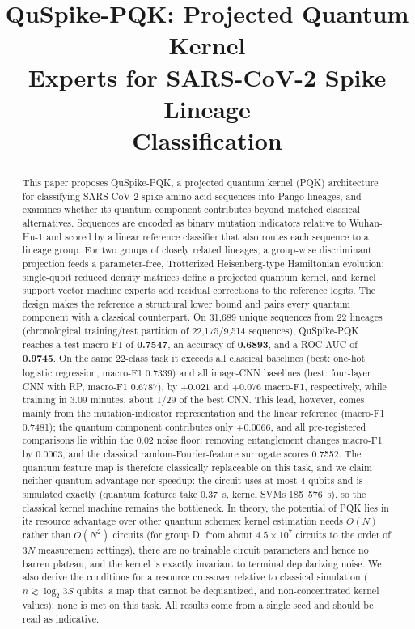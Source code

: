 \documentclass[conference]{IEEEtran}
\begin{document}
\raggedbottom

\title{QuSpike-PQK: Projected Quantum Kernel\\
Experts for SARS-CoV-2 Spike Lineage\\
Classification}
\author{}
\maketitle

\begin{abstract}
This paper proposes QuSpike-PQK, a projected quantum kernel (PQK) architecture for classifying SARS-CoV-2 spike amino-acid sequences into Pango lineages, and examines whether its quantum component contributes beyond matched classical alternatives. Sequences are encoded as binary mutation indicators relative to Wuhan-Hu-1 and scored by a linear reference classifier that also routes each sequence to a lineage group. For two groups of closely related lineages, a group-wise discriminant projection feeds a parameter-free, Trotterized Heisenberg-type Hamiltonian evolution; single-qubit reduced density matrices define a projected quantum kernel, and kernel support vector machine experts add residual corrections to the reference logits. The design makes the reference a structural lower bound and pairs every quantum component with a classical counterpart. On 31,689 unique sequences from 22 lineages (chronological training/test partition of 22,175/9,514 sequences), QuSpike-PQK reaches a test macro-F1 of \textbf{0.7547}, an accuracy of \textbf{0.6893}, and a ROC AUC of \textbf{0.9745}. On the same 22-class task it exceeds all classical baselines (best: one-hot logistic regression, macro-F1 0.7339) and all image-CNN baselines (best: four-layer CNN with RP, macro-F1 0.6787), by $+0.021$ and $+0.076$ macro-F1, respectively, while training in 3.09 minutes, about 1/29 of the best CNN. This lead, however, comes mainly from the mutation-indicator representation and the linear reference (macro-F1 0.7481); the quantum component contributes only $+0.0066$, and all pre-registered comparisons lie within the 0.02 noise floor: removing entanglement changes macro-F1 by 0.0003, and the classical random-Fourier-feature surrogate scores 0.7552. The quantum feature map is therefore classically replaceable on this task, and we claim neither quantum advantage nor speedup: the circuit uses at most 4 qubits and is simulated exactly (quantum features take 0.37~s, kernel SVMs 185--576~s), so the classical kernel machine remains the bottleneck. In theory, the potential of PQK lies in its resource advantage over other quantum schemes: kernel estimation needs $O(N)$ rather than $O(N^2)$ circuits (for group D, from about $4.5\times10^7$ circuits to the order of $3N$ measurement settings), there are no trainable circuit parameters and hence no barren plateau, and the kernel is exactly invariant to terminal depolarizing noise. We also derive the conditions for a resource crossover relative to classical simulation ($n\gtrsim\log_2 3S$ qubits, a map that cannot be dequantized, and non-concentrated kernel values); none is met on this task. All results come from a single seed and should be read as indicative.

\end{abstract}
\end{document}
